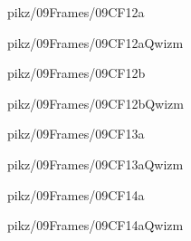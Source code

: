 \documentclass[9pt,xcolor={svgnames, x11names}]{beamer}
\begin{document}

\begin{frame}{pikz/09Frames/09CF12a}
	
\end{frame}


\begin{frame}{pikz/09Frames/09CF12aQwizm}
	
\end{frame}


\begin{frame}{pikz/09Frames/09CF12b}
	
\end{frame}


\begin{frame}{pikz/09Frames/09CF12bQwizm}
	
\end{frame}


\begin{frame}{pikz/09Frames/09CF13a}
	
\end{frame}


\begin{frame}{pikz/09Frames/09CF13aQwizm}
	
\end{frame}


\begin{frame}{pikz/09Frames/09CF14a}
	
\end{frame}


\begin{frame}{pikz/09Frames/09CF14aQwizm}
	
\end{frame}
\end{document}
